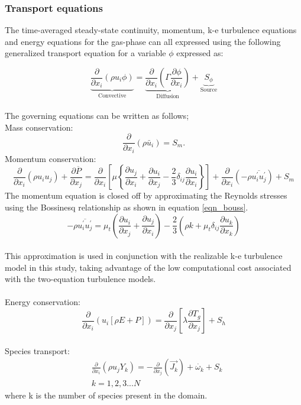 \documentclass{webofc}
\begin{document}
\subsubsection{Transport equations}
The time-averaged steady-state continuity, momentum, k-e turbulence equations and energy equations for the gas-phase can all expressed using the following generalized transport equation for a variable $\phi$ expressed as:

\begin{equation}\label{eqn_general}
\underbrace{\frac{\partial}{\partial x_{i}}(\rho u_{i}\phi)}_{\text{Convective}}= \underbrace{\frac{\partial}{\partial x_{i}}(\Gamma\frac{\partial \phi}{\partial x_{i}})}_{\text{Diffusion}}+\underbrace{S_{\phi}}_{\text{Source}} 
\end{equation}\\
The governing equations can be written as follows;\\
Mass conservation:
\begin{equation}\label{eqn_RANS_mass}
\frac{\partial}{\partial x_{i}}(\rho \bar{u}_{i})=S_{m}.
\end{equation}
Momentum conservation:
\\
\begin{equation}\label{eqn_momentum}
\frac{\partial}{\partial x_{i}}(\rho u_{i}u_{j})+\frac{\partial \overline{P}}{\partial x_{j}}=\frac{\partial}{\partial x_{i}}\left[\mu\left\{\frac{\partial u_{j}}{\partial x_{i}}+\frac{\partial u_{i}}{\partial x_{j}}-\frac{2}{3}\delta_{ij}\frac{\partial u_{i}}{\partial x_{i}}\right\}\right]+\frac{\partial}{\partial x_{i}}(-\rho\overline{u_{i}^{'}u_{j}^{'}})+S_m
\end{equation}
The momentum equation is closed off by approximating the Reynolds stresses using the Bossinesq relationship as shown in equation \ref{eqn_bouss}.
\begin{equation}\label{eqn_bouss}
-\rho\overline{u_{i}^{'}u_{j}^{'}}=\mu_{t}\left(\frac{\partial u_{i}}{\partial x_{j}}+\frac{\partial u_{j}}{\partial x_{i}}\right)-\frac{2}{3}\left(\rho k+\mu_{t}\delta_{ij}\frac{\partial u_{k}}{\partial x_{k}}\right)
\end{equation}
\\
This approximation is used in conjunction with the realizable k-e turbulence model \cite{shih} in this study, taking advantage of the low computational cost associated with the two-equation turbulence models. 
\\
\\
Energy conservation:
\begin{equation}\label{eqn_energy}
\frac{\partial }{\partial x_{i}} (u_{i}[\rho E+P])=\frac{\partial }{\partial x_{j}}\left[\lambda\frac{\partial T_{g}}{\partial x_{j}}\right] +S_{h}
\end{equation}
\\
Species transport:
\begin{equation}\label{eqn_species}
\begin{split}
&\frac{\partial}{\partial x_{i}}(\rho u_{j}Y_{k})=-\frac{\partial}{\partial x_{j}}(\vec{J_{k}})+\dot{\omega_{k}}+S_{k}\\
&k = 1,2,3...N
\end{split}
\end{equation}
where k is the number of species present in the domain.
\end{document}
